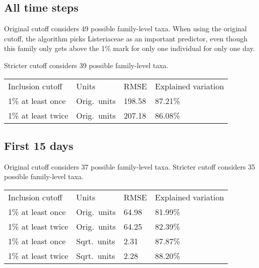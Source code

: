 \documentclass{article}
\begin{document}
\subsection{All time steps}

Original cutoff considers 49 possible family-level taxa.  When using
the original cutoff, the algorithm picks Listeriaceae as an important
predictor, even though this family only gets above the 1\% mark for
only one individual for only one day.

Stricter cutoff considers 39 possible family-level taxa.

\begin{tabular}{llll}
Inclusion cutoff & Units  & RMSE & Explained variation\\
1\% at least once  & Orig.~units & 198.58 & 87.21\%\\
1\% at least twice & Orig.~units & 207.18 & 86.08\% %
\end{tabular}



\subsection{First 15 days}

Original cutoff considers 37 possible family-level taxa.
Stricter cutoff considers 35 possible family-level taxa.

\begin{tabular}{llll}
Inclusion cutoff & Units  & RMSE & Explained variation\\
1\% at least once  & Orig.~units & 64.98 & 81.99\%\\
1\% at least twice & Orig.~units & 64.25 & 82.39\%\\
1\% at least once  & Sqrt.~units & 2.31 & 87.87\%\\
1\% at least twice & Sqrt.~units & 2.28 & 88.20\%
\end{tabular}
\end{document}
